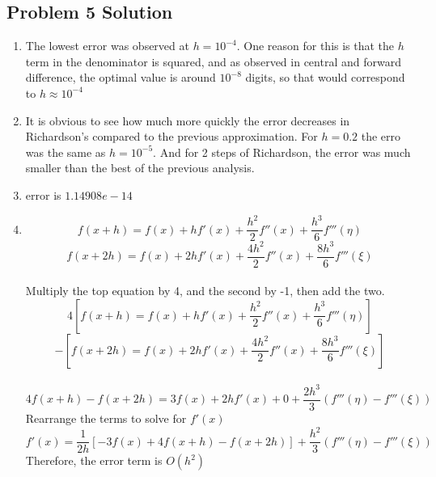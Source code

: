 \documentclass[]{article}
\begin{document}
\subsection{Problem 5 Solution} %
\begin{enumerate}
\def\labelenumi{\arabic{enumi}.}
\item
The lowest error was observed at $h=10^{-4}$. One reason for this is that the $h$ term in the denominator is squared, and as observed in central and forward difference, the optimal value is around $10^{-8}$ digits, so that would correspond to $h\approx 10^{-4}$
\item
It is obvious to see how much more quickly the error decreases in Richardson's compared to the previous approximation. For $h=0.2$ the erro was the same as $h=10^{-5}$. And for 2 steps of Richardson, the error was much smaller than the best of the previous analysis. 
\item
error is $1.14908e-14$
\item
\[f(x+h) = f(x) +hf'(x) + \frac{h^2}{2}f''(x) + \frac{h^3}{6}f'''(\eta) \]
\[f(x+2h)=f(x)+2hf'(x)+\frac{4h^2}{2}f''(x) + \frac{8h^3}{6}f'''(\xi)\]
\\
Multiply the top equation by 4, and the second by -1, then add the two. 
\[4[f(x+h) = f(x) +hf'(x) + \frac{h^2}{2}f''(x) + \frac{h^3}{6}f'''(\eta)] \]
\[-[f(x+2h)=f(x)+2hf'(x)+\frac{4h^2}{2}f''(x) + \frac{8h^3}{6}f'''(\xi)] \]
\\
\[4f(x+h)-f(x+2h) = 3f(x)+2hf'(x)+0 +\frac{2h^3}{3}(f'''(\eta)-f'''(\xi)) \]
Rearrange the terms to solve for $f'(x)$
\[f'(x) = \frac{1}{2h}[-3f(x)+4f(x+h)-f(x+2h)] + \frac{h^2}{3}(f'''(\eta)-f'''(\xi))\]
Therefore, the error term is $O(h^2)$
\end{enumerate}

\end{document}
